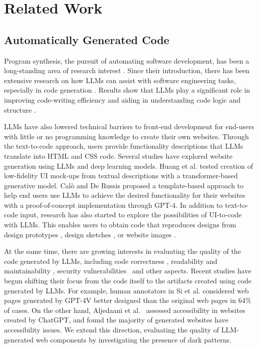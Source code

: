 \section{Related Work}
\subsection{Automatically Generated Code} %
Program synthesis, the pursuit of automating software development, has been a long-standing area of research interest \cite{a:32, a:33}. Since their introduction, there has been extensive research on how LLMs can assist with software engineering tasks, especially in code generation \cite{a:34, a:35, a:7}. Results show that LLMs play a significant role in improving code-writing efficiency and aiding in understanding code logic and structure \cite{a:21}. 

LLMs have also lowered technical barriers to front-end development for end-users with little or no programming knowledge to create their own websites. Through the text-to-code approach, users provide functionality descriptions that LLMs translate into HTML and CSS code. Several studies have explored website generation using LLMs and deep learning models. Huang et al. \cite{a:28} tested creation of low-fidelity UI mock-ups from textual descriptions with a transformer-based generative model. Cal{\`o} and De Russis \cite{a:27} proposed a template-based approach to help end users use LLMs to achieve the desired functionality for their websites with a proof-of-concept implementation through GPT-4. In addition to text-to-code input, research has also started to explore the possibilities of UI-to-code with LLMs. This enables users to obtain code that reproduces designs from design prototypes \cite{a:29}, design sketches \cite{a:3}, or website images \cite{a:4}. 

At the same time, there are growing interests in evaluating the quality of the code generated by LLMs, including code correctness \cite{a:7,a:23,zhong2024can}, readability and maintainability \cite{a:7, dillmann2024evaluation}, security vulnerabilities~\cite{siddiq2022empirical} and other aspects. Recent studies have begun shifting their focus from the code itself to the artifacts created using code generated by LLMs. For example, human annotators in Si et al. \cite{a:4} considered web pages generated by GPT-4V better designed than the original web pages in 64\% of cases. On the other hand, Aljedaani et al.~\cite{a:6} assessed accessibility in websites created by ChatGPT, and found the majority of generated websites have accessibility issues. We extend this direction, evaluating the quality of LLM-generated web components by investigating the presence of dark patterns. 

